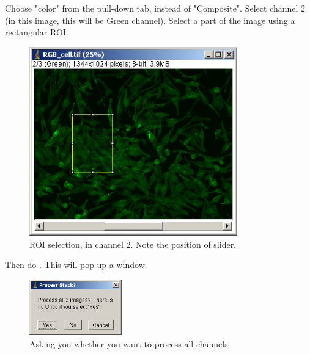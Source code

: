 \begin{indentexercise}{1}
Choose "color" from the pull-down tab, instead of "Composite". Select channel 2 (in this image, this will be Green channel). Select a part of the image using a rectangular ROI. 
\begin{figure}[H]
\begin{center}
\includegraphics[width=9cm]{fig/CMCIBasicCourse201102-img18.png}
\caption{ ROI selection, in channel 2. Note the position of slider.}
\label{fig:img18}
\end{center}
\end{figure}

Then do . This will pop up a window. 
\begin{figure}[H]
\begin{center}
\includegraphics[width=4cm]{fig/CMCIBasicCourse201102-img19.png}
\caption{ Asking you whether you want to process all channels.}
\label{fig:img19}
\end{center}
\end{figure}


\end{indentexercise}
